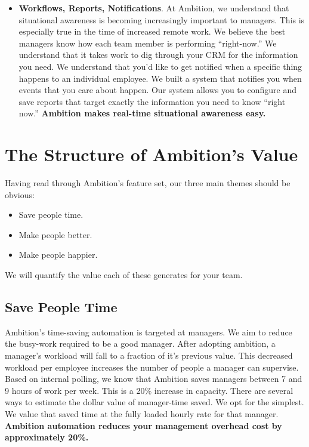 \documentclass[paper=a4, fontsize=11pt abstract]{scrartcl}
\numberwithin{equation}{section}		%
\numberwithin{figure}{section}			%
\numberwithin{table}{section}				%
\begin{document}
\begin{itemize}
   \item \textbf{Workflows, Reports, Notifications}.
   At Ambition, we understand that situational awareness is becoming increasingly important to managers.
   This is especially true in the time of increased remote work.
   We believe the best managers know how each team member is performing ``right-now.''
   We understand that it takes work to dig through your CRM for the information you need.
   We understand that you'd like to get notified when a specific thing happens to an individual employee.
   We built a system that notifies you when events that you care about happen.
   Our system allows you to configure and save reports that target exactly the information you need to know ``right now.''
   \textbf{Ambition makes real-time situational awareness easy.} 
    
\end{itemize}

\section{The Structure of Ambition's Value}
Having read through Ambition's feature set, our three main themes should be obvious:
\begin{itemize}
    \item Save people time.
    \item Make people better.
    \item Make people happier.
\end{itemize}

We will quantify the value each of these generates for your team.

\subsection{Save People Time}
Ambition's time-saving automation is targeted at managers.
We aim to reduce the busy-work required to be a good manager.
After adopting ambition, a manager's workload will fall to a fraction of it's previous value.
This decreased workload per employee increases the number of people a manager can supervise.
Based on internal polling, we know that Ambition saves managers between 7 and 9 hours of work per week.
This is a 20\% increase in capacity.
There are several ways to estimate the dollar value of manager-time saved.
We opt for the simplest.
We value that saved time at the fully loaded hourly rate for that manager.
\textbf{Ambition automation reduces your management overhead cost by approximately 20\%.}
\end{document}
